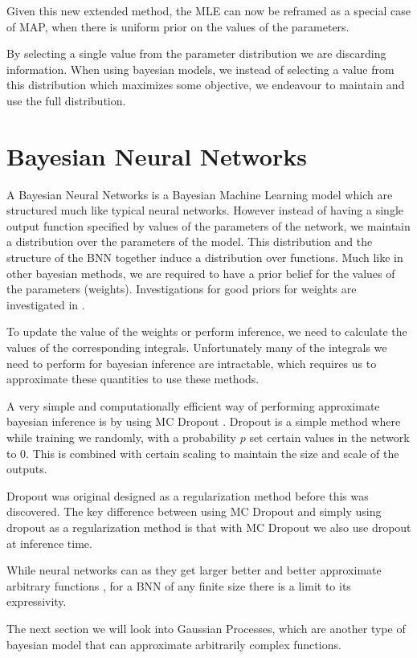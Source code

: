 \documentclass[12pt, a4paper]{report}
\theoremstyle{definition}
\theoremstyle{definition}
\theoremstyle{definition}
\begin{document}
Given this new extended method, the MLE can now be reframed as a special case of MAP, when there is  uniform prior on the values of the parameters.

By selecting a single value from the parameter distribution we are discarding information. When using bayesian models, we instead of selecting a value from this distribution which maximizes some objective, we endeavour to maintain and use the full distribution.


\section{Bayesian Neural Networks}
\label{sec:BNNs}


A Bayesian Neural Networks is a Bayesian Machine Learning model which are structured much like typical neural networks. However instead of having a single output function specified by values of the parameters of the network, we maintain a distribution over the parameters of the model. This distribution and the structure of the BNN together induce a distribution over functions. Much like in other bayesian methods, we are required to have a prior belief for the values of the parameters (weights). Investigations for good priors for weights are investigated in \cite{}.

To update the value of the weights or perform inference, we need to calculate the values of the corresponding integrals. Unfortunately many of the integrals we need to perform for bayesian inference are intractable, which requires us to approximate these quantities to use these methods.

A very simple and computationally efficient way of performing approximate bayesian inference is by using MC Dropout \cite{gal2016dropout}. Dropout is a simple method where while training we randomly, with a probability $p$ set certain values in the network to 0. This is combined with certain scaling to maintain the size and scale of the outputs.

Dropout was original designed as a regularization method before this was discovered. The key difference between using MC Dropout and simply using dropout as a regularization method is that with MC Dropout we also use dropout at inference time.

While neural networks can as they get larger better and better approximate arbitrary functions \cite{}, for a BNN of any finite size there is a limit to its expressivity.

The next section we will look into Gaussian Processes, which are another type of bayesian model that can approximate arbitrarily \cite{} complex functions.
\end{document}
